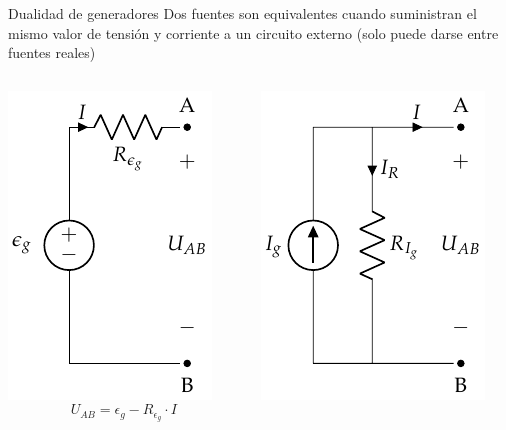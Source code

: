 \documentclass[aspectratio=169, xcolor={usenames,svgnames,dvipsnames}]{beamer}
\begin{document}
\begin{frame}{Dualidad de generadores}
    Dos fuentes son equivalentes cuando suministran el \alert{mismo valor de tensión y corriente} a un circuito externo (solo puede darse entre \alert{fuentes reales})
    \begin{columns}
\begin{column}{0.3\columnwidth}
\begin{center}
\vspace{-8mm}
\includegraphics[height=0.4\textheight]{../figs/FuenteTensionRealDC.pdf}\\
\begin{equation*}
		U_{AB} = \epsilon_g - R_{\epsilon_g} \cdot I
	\end{equation*}
\end{center}
\end{column}
\begin{column}{0.3\columnwidth}
\begin{center}
\includegraphics[height=0.4\textheight]{../figs/FuenteCorrienteRealDC.pdf}\\

\end{center}
\end{column}
\end{columns}
\end{frame}
\end{document}
